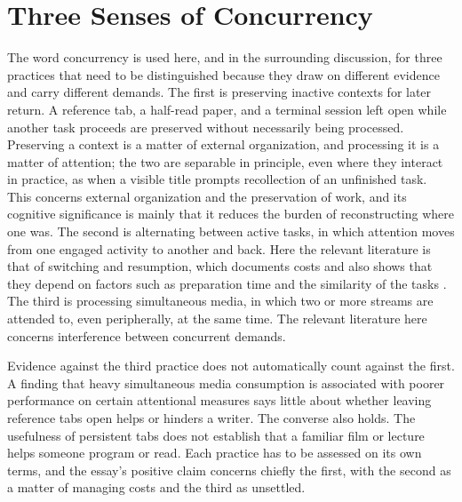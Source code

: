 \documentclass[12pt]{article}
\begin{document}
\section{Three Senses of Concurrency}

The word concurrency is used here, and in the surrounding discussion, for three practices that need to be distinguished because they draw on different evidence and carry different demands. The first is preserving inactive contexts for later return. A reference tab, a half-read paper, and a terminal session left open while another task proceeds are preserved without necessarily being processed. Preserving a context is a matter of external organization, and processing it is a matter of attention; the two are separable in principle, even where they interact in practice, as when a visible title prompts recollection of an unfinished task. This concerns external organization and the preservation of work, and its cognitive significance is mainly that it reduces the burden of reconstructing where one was. The second is alternating between active tasks, in which attention moves from one engaged activity to another and back. Here the relevant literature is that of switching and resumption, which documents costs and also shows that they depend on factors such as preparation time and the similarity of the tasks \cite{monsell2003task}. The third is processing simultaneous media, in which two or more streams are attended to, even peripherally, at the same time. The relevant literature here concerns interference between concurrent demands.

Evidence against the third practice does not automatically count against the first. A finding that heavy simultaneous media consumption is associated with poorer performance on certain attentional measures says little about whether leaving reference tabs open helps or hinders a writer. The converse also holds. The usefulness of persistent tabs does not establish that a familiar film or lecture helps someone program or read. Each practice has to be assessed on its own terms, and the essay's positive claim concerns chiefly the first, with the second as a matter of managing costs and the third as unsettled.
\end{document}
